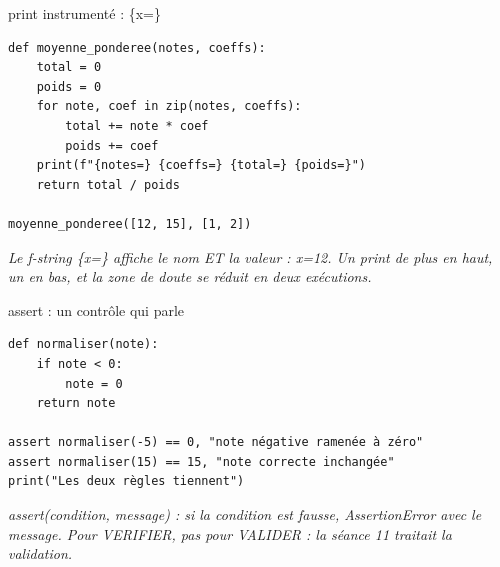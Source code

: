 \documentclass[aspectratio=169,11pt]{beamer}
\begin{document}
\begin{frame}[fragile]{print instrumenté : \{x=\}}

\begin{lstlisting}[style=py]
def moyenne_ponderee(notes, coeffs):
    total = 0
    poids = 0
    for note, coef in zip(notes, coeffs):
        total += note * coef
        poids += coef
    print(f"{notes=} {coeffs=} {total=} {poids=}")
    return total / poids

moyenne_ponderee([12, 15], [1, 2])
\end{lstlisting}
\vspace{0.5pt}

{\small\color{PyGris}\itshape Le f-string \{x=\} affiche le nom ET la valeur : x=12. Un print de plus en haut, un en bas, et la zone de doute se réduit en deux exécutions.}

\end{frame}

\begin{frame}[fragile]{assert : un contrôle qui parle}

\begin{lstlisting}[style=py]
def normaliser(note):
    if note < 0:
        note = 0
    return note

assert normaliser(-5) == 0, "note négative ramenée à zéro"
assert normaliser(15) == 15, "note correcte inchangée"
print("Les deux règles tiennent")
\end{lstlisting}
\vspace{0.5pt}

{\small\color{PyGris}\itshape assert(condition, message) : si la condition est fausse, AssertionError avec le message. Pour VERIFIER, pas pour VALIDER : la séance 11 traitait la validation.}

\end{frame}
\end{document}
